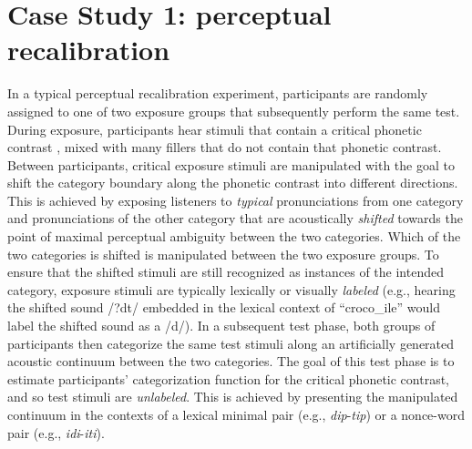\documentclass[
  11pt,
  man,floatsintext]{apa6}
\begin{document}
\section{Case Study 1: perceptual recalibration}\label{sec:PR}

In a typical perceptual recalibration experiment, participants are randomly assigned to one of two exposure groups that subsequently perform the same test. During exposure, participants hear stimuli that contain a critical phonetic contrast \autocite[e.g., syllable-intial /d/ vs.~/t/, as in \emph{croco\emph{d}ile} or \emph{cafe\emph{t}eria},][]{kraljic-samuel2006}, mixed with many fillers that do not contain that phonetic contrast. Between participants, critical exposure stimuli are manipulated with the goal to shift the category boundary along the phonetic contrast into different directions. This is achieved by exposing listeners to \emph{typical} pronunciations from one category and pronunciations of the other category that are acoustically \emph{shifted} towards the point of maximal perceptual ambiguity between the two categories. Which of the two categories is shifted is manipulated between the two exposure groups. To ensure that the shifted stimuli are still recognized as instances of the intended category, exposure stimuli are typically lexically or visually \emph{labeled} (e.g., hearing the shifted sound /?dt/ embedded in the lexical context of ``croco\_ile'' would label the shifted sound as a /d/). In a subsequent test phase, both groups of participants then categorize the same test stimuli along an artificially generated acoustic continuum between the two categories. The goal of this test phase is to estimate participants' categorization function for the critical phonetic contrast, and so test stimuli are \emph{unlabeled}. This is achieved by presenting the manipulated continuum in the contexts of a lexical minimal pair (e.g., \emph{dip}-\emph{tip}) or a nonce-word pair (e.g., \emph{idi}-\emph{iti}).
\end{document}
